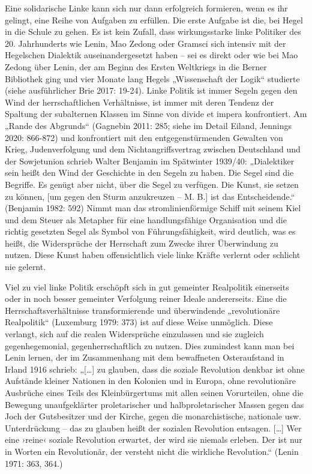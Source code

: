 \begin{multicols*}{2}
Eine solidarische Linke kann sich nur dann erfolgreich formieren, wenn es ihr gelingt, eine Reihe von Aufgaben zu erfüllen. Die erste Aufgabe ist die, bei Hegel in die Schule zu gehen. Es ist kein Zufall, dass wirkungsstarke linke Politiker des 20. Jahrhunderts wie Lenin, Mao Zedong oder Gramsci sich intensiv mit der Hegelschen Dialektik auseinandergesetzt haben – sei es direkt oder wie bei Mao Zedong über Lenin, der am Beginn des Ersten Weltkriegs in die Berner Bibliothek ging und vier Monate lang Hegels „Wissenschaft der Logik“ studierte (siehe ausführlicher Brie 2017: 19-24). Linke Politik ist immer Segeln gegen den Wind der herrschaftlichen Verhältnisse, ist immer mit deren Tendenz der Spaltung der subalternen Klassen im Sinne von divide et impera konfrontiert. Am „Rande des Abgrunds“ (Gagnebin 2011: 285; siehe im Detail Eiland, Jennings 2020: 866-872) und konfrontiert mit den entgegenstürmenden Gewalten von Krieg, Judenverfolgung und dem Nichtangriffsvertrag zwischen Deutschland und der Sowjetunion schrieb Walter Benjamin im Spätwinter 1939/40: „Dialektiker sein heißt den Wind der Geschichte in den Segeln zu haben. Die Segel sind die Begriffe. Es genügt aber nicht, über die Segel zu verfügen. Die Kunst, sie setzen zu können, [um gegen den Sturm anzukreuzen – M. B.] ist das Entscheidende.“ (Benjamin 1982: 592) Nimmt man das stromlinienförmige Schiff mit seinem Kiel und dem Steuer als Metapher für eine handlungsfähige Organisation und die richtig gesetzten Segel als Symbol von Führungsfähigkeit, wird deutlich, was es heißt, die Widersprüche der Herrschaft zum Zwecke ihrer Überwindung zu nutzen. Diese Kunst haben offensichtlich viele linke Kräfte verlernt oder schlicht nie gelernt. 

Viel zu viel linke Politik erschöpft sich in gut gemeinter Realpolitik einerseits oder in noch besser gemeinter Verfolgung reiner Ideale andererseits. Eine die Herrschaftsverhältnisse transformierende und überwindende „revolutionäre Realpolitik“ (Luxemburg 1979: 373) ist auf diese Weise unmöglich. Diese verlangt, sich auf die realen Widersprüche einzulassen und sie zugleich gegenhegemonial, gegenherrschaftlich zu nutzen. Dies zumindest kann man bei Lenin lernen, der im Zusammenhang mit dem bewaffneten Osteraufstand in Irland 1916 schrieb: „[…] zu glauben, dass die soziale Revolution denkbar ist ohne Aufstände kleiner Nationen in den Kolonien und in Europa, ohne revolutionäre Ausbrüche eines Teils des Kleinbürgertums mit allen seinen Vorurteilen, ohne die Bewegung unaufgeklärter proletarischer und halbproletarischer Massen gegen das Joch der Gutsbesitzer und der Kirche, gegen die monarchistische, nationale usw. Unterdrückung – das zu glauben heißt der sozialen Revolution entsagen. […] Wer eine ›reine‹ soziale Revolution erwartet, der wird sie niemals erleben. Der ist nur in Worten ein Revolutionär, der versteht nicht die wirkliche Revolution.“ (Lenin 1971: 363, 364.)


\end{multicols*}
